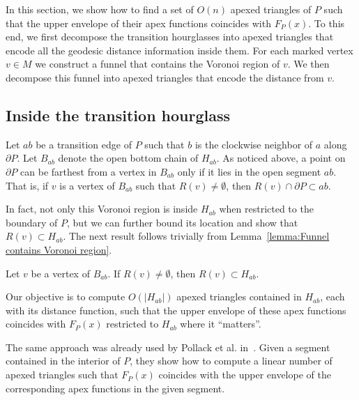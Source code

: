 \documentclass[a4paper,UKenglish]{lipics}
\newcommand{\F}[2]{\ensuremath{F_{\scriptscriptstyle #1}(#2)}}
\newcommand{\fn}[2]{\ensuremath{S_{\scriptscriptstyle #1}(#2)}}
\begin{document}
In this section, we show how to find a set of $O(n)$ apexed triangles of $P$ such that the upper envelope of their apex functions coincides with $\F{P}{x}$.
To this end, we first decompose the transition hourglasses into apexed triangles that encode all the geodesic distance information inside them. For each marked vertex $v\in M$ we construct a funnel that contains the Voronoi region of $v$.  We then decompose this funnel into apexed triangles that encode the distance from $v$.

\subsection{Inside the transition hourglass}
Let $ab$ be a transition edge of $P$  such that $b$ is the clockwise neighbor of $a$ along $\partial P$.
Let $B_{ab}$ denote the open bottom chain of $H_{ab}$.
As noticed above, a point on $\partial P$ can be farthest from a vertex in $B_{ab}$ only if it lies in the open segment $ab$.
That is, if $v$ is a vertex of $B_{ab}$ such that $R(v)\neq \emptyset$, then $R(v)\cap \partial P \subset ab$.

In fact, not only this Voronoi region is inside $H_{ab}$ when restricted to the boundary of $P$, but we can further bound its location and show that $R(v)\subset H_{ab}$. 
 The next result follows trivially from Lemma~\ref{lemma:Funnel contains Voronoi region}.

\begin{corollary}\label{lemma:Cell contained in geodesic triangle}
Let $v$ be a vertex of $B_{ab}$. If $R(v)\neq \emptyset$, then $R(v) \subset H_{ab}$.
\end{corollary}


Our objective is to compute $O(|H_{ab}|)$ apexed triangles contained in $H_{ab}$, each with its distance function, such that the upper envelope of these apex functions coincides with $\F{P}{x}$ restricted to $H_{ab}$ where it ``matters''.

The same approach was already used by Pollack et al. in~\cite[Section 3]{pollackComputingCenter}. 
Given a segment contained in the interior of $P$, they show 
how to compute a linear number of apexed triangles such that $\F{P}{x}$ coincides with the upper envelope of the corresponding apex functions in the given segment.
\end{document}
